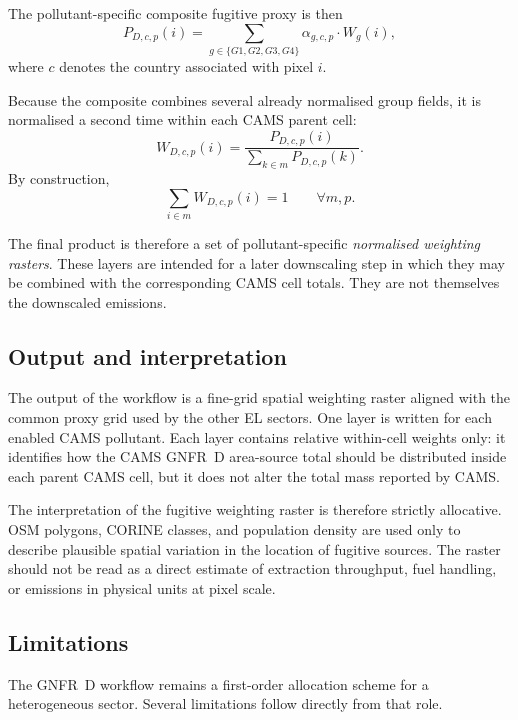 The pollutant-specific composite fugitive proxy is then
\begin{equation}
  P_{D,c,p}(i) =
  \sum_{g \in \{G1,G2,G3,G4\}}
  \alpha_{g,c,p} \cdot W_g(i),
\end{equation}
where $c$ denotes the country associated with pixel $i$.

Because the composite combines several already normalised group fields,
it is normalised a second time within each CAMS parent cell:
\begin{equation}
  W_{D,c,p}(i) =
  \frac{P_{D,c,p}(i)}
       {\displaystyle\sum_{k \in m} P_{D,c,p}(k)}.
\end{equation}
By construction,
\begin{equation}
  \sum_{i \in m} W_{D,c,p}(i) = 1
  \qquad \forall m,p.
\end{equation}

The final product is therefore a set of pollutant-specific
\emph{normalised weighting rasters}. These layers are intended for a
later downscaling step in which they may be combined with the
corresponding CAMS cell totals. They are not themselves the downscaled
emissions.

\subsection{Output and interpretation}

The output of the workflow is a fine-grid spatial weighting raster
aligned with the common proxy grid used by the other EL sectors. One
layer is written for each enabled CAMS pollutant. Each layer contains
relative within-cell weights only: it identifies how the CAMS GNFR~D
area-source total should be distributed inside each parent CAMS cell,
but it does not alter the total mass reported by CAMS.

The interpretation of the fugitive weighting raster is therefore
strictly allocative. OSM polygons, CORINE classes, and population
density are used only to describe plausible spatial variation in the
location of fugitive sources. The raster should not be read as a direct
estimate of extraction throughput, fuel handling, or emissions in
physical units at pixel scale.

\subsection{Limitations}

The GNFR~D workflow remains a first-order allocation scheme for a
heterogeneous sector. Several limitations follow directly from that
role.

